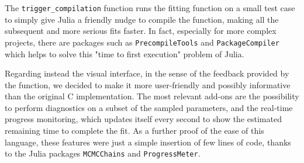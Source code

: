 \documentclass[12pt,	%
	a4paper,		%
	twoside,		%
	openright,		%
	titlepage,%
	]{book}
\theoremstyle{definition}
\newcommand{\mjline}[1]{\texttt{#1}}
\newenvironment{code}{\captionsetup{type=listing}}{}
\begin{document}
The \mjline{trigger_compilation} function runs the fitting function on a small test case to simply give Julia a friendly nudge to compile the function, making all the subsequent and more serious fits faster. In fact, especially for more complex projects, there are packages such as \mjline{PrecompileTools} and \mjline{PackageCompiler} which helps to solve this "time to first execution" problem of Julia.

Regarding instead the visual interface, in the sense of the feedback provided by the function, we decided to make it more user-friendly and possibly informative than the original C implementation. The most relevant add-ons are the possibility to perform diagnostics on a subset of the sampled parameters, and the real-time progress monitoring, which updates itself every second to show the estimated remaining time to complete the fit. As a further proof of the ease of this language, these features were just a simple insertion of few lines of code, thanks to the Julia packages \mjline{MCMCChains} and \mjline{ProgressMeter}.



\end{document}
